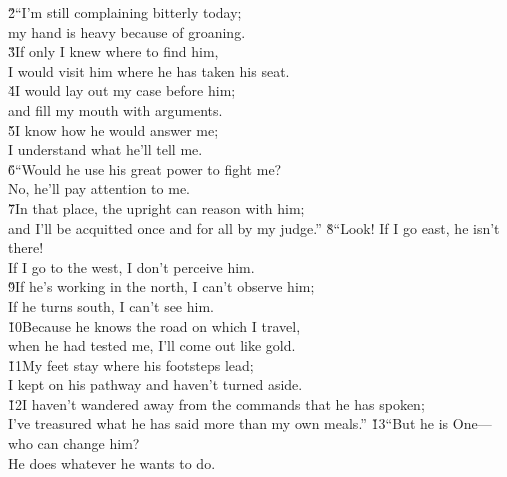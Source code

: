\begin{poetry}
\poeml \v{2}``I'm still complaining bitterly today; \\
\poemll    my hand is heavy because of groaning. \\
\poeml \v{3}If only I knew where to find him, \\
\poemll    I would visit him where he has taken his seat. \\
\poeml \v{4}I would lay out my case before him; \\
\poemll    and fill my mouth with arguments. \\
\poeml \v{5}I know how he would answer me; \\
\poemll    I understand what he'll tell me. \\
\poeml \v{6}``Would he use his great power to fight me? \\
\poemll    No, he'll pay attention to me. \\
\poeml \v{7}In that place, the upright can reason with him; \\
\poemll    and I'll be acquitted once and for all by my judge.''
\poeml \v{8}``Look! If I go east, he isn't there! \\
\poemll    If I go to the west, I don't perceive him. \\
\poeml \v{9}If he's working in the north, I can't observe him; \\
\poemll    If he turns south, I can't see him. \\
\poeml \v{10}Because he knows the road on which I travel, \\
\poemll    when he had tested me, I'll come out like gold. \\
\poeml \v{11}My feet stay where his footsteps lead; \\
\poemll    I kept on his pathway and haven't turned aside. \\
\poeml \v{12}I haven't wandered away from the commands that he has spoken; \\
\poemll    I've treasured what he has said more than my own meals.''
\poeml \v{13}``But he is One---who can change him? \\
\poemll    He does whatever he wants to do. \\

\end{poetry}
